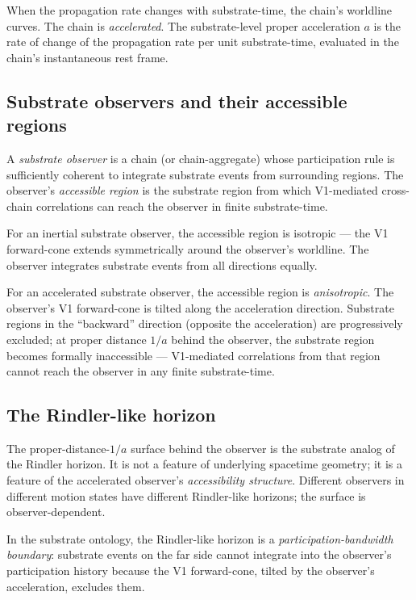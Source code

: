 \documentclass[11pt,a4paper]{article}
\begin{document}
When the propagation rate changes with substrate-time, the chain's worldline curves. The chain is \emph{accelerated}. The substrate-level proper acceleration $a$ is the rate of change of the propagation rate per unit substrate-time, evaluated in the chain's instantaneous rest frame.

\subsection{Substrate observers and their accessible regions}

A \emph{substrate observer} is a chain (or chain-aggregate) whose participation rule is sufficiently coherent to integrate substrate events from surrounding regions. The observer's \emph{accessible region} is the substrate region from which V1-mediated cross-chain correlations can reach the observer in finite substrate-time.

For an inertial substrate observer, the accessible region is isotropic --- the V1 forward-cone extends symmetrically around the observer's worldline. The observer integrates substrate events from all directions equally.

For an accelerated substrate observer, the accessible region is \emph{anisotropic}. The observer's V1 forward-cone is tilted along the acceleration direction. Substrate regions in the ``backward'' direction (opposite the acceleration) are progressively excluded; at proper distance $1/a$ behind the observer, the substrate region becomes formally inaccessible --- V1-mediated correlations from that region cannot reach the observer in any finite substrate-time.

\subsection{The Rindler-like horizon}

The proper-distance-$1/a$ surface behind the observer is the substrate analog of the Rindler horizon. It is not a feature of underlying spacetime geometry; it is a feature of the accelerated observer's \emph{accessibility structure}. Different observers in different motion states have different Rindler-like horizons; the surface is observer-dependent.

In the substrate ontology, the Rindler-like horizon is a \emph{participation-bandwidth boundary}: substrate events on the far side cannot integrate into the observer's participation history because the V1 forward-cone, tilted by the observer's acceleration, excludes them.
\end{document}
